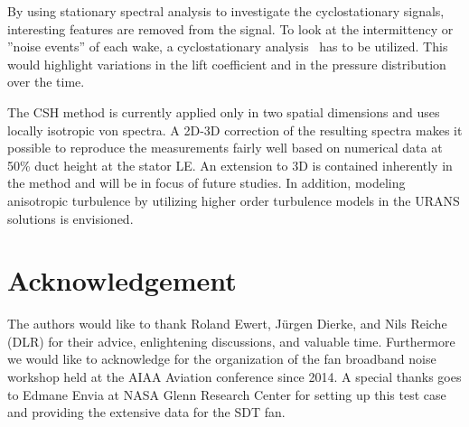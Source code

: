 By using stationary spectral analysis to investigate the cyclostationary signals, interesting features are removed from the signal. To look at the intermittency or ''noise events'' of each wake, a cyclostationary analysis~\cite{gardner_cyclostationarity:_2006} has to be utilized. This would highlight variations in the lift coefficient and in the pressure distribution over the time.

The CSH method is currently applied only in two spatial dimensions and uses locally isotropic von \Karman spectra. A 2D-3D correction of the resulting spectra makes it possible to reproduce the measurements fairly well based on numerical data at 50\% duct height at the stator LE. An extension to 3D is contained inherently in the method and will be in focus of future studies.  In addition, modeling anisotropic turbulence by utilizing higher order turbulence models in the URANS solutions is envisioned.




\section{Acknowledgement}
The authors would like to thank Roland Ewert, Jürgen Dierke, and Nils Reiche (DLR) for their advice, enlightening discussions, and valuable time.
Furthermore we would like to acknowledge \citet{envia_panel_2015} for the organization of the fan broadband noise workshop held at the AIAA Aviation conference since 2014. A special thanks goes to Edmane Envia at NASA Glenn Research Center for setting up this test case and providing the extensive data for the SDT fan.




